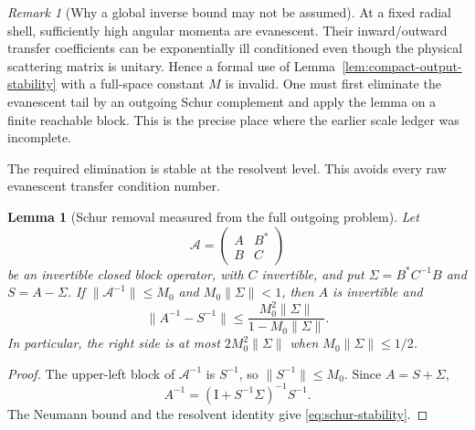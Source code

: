 \documentclass[11pt]{article}
\newtheorem{lemma}[theorem]{Lemma}
\theoremstyle{remark}
\newtheorem{remark}[theorem]{Remark}
\newcommand{\Id}{\mathrm I}
\begin{document}
\begin{remark}[Why a global inverse bound may not be assumed]
At a fixed radial shell, sufficiently high angular momenta are evanescent.
Their inward/outward transfer coefficients can be exponentially ill
conditioned even though the physical scattering matrix is unitary.  Hence a
formal use of Lemma~\ref{lem:compact-output-stability} with a full-space
constant $M$ is invalid.  One must first eliminate the evanescent tail by an
outgoing Schur complement and apply the lemma on a finite reachable block.
This is the precise place where the earlier scale ledger was incomplete.
\end{remark}

The required elimination is stable at the resolvent level.  This avoids every
raw evanescent transfer condition number.

\begin{lemma}[Schur removal measured from the full outgoing problem]
\label{lem:schur-stability}
Let
\[
 \mathcal A=
 \begin{pmatrix}A&B^*\\ B&C\end{pmatrix}
\]
be an invertible closed block operator, with $C$ invertible, and put
$\Sigma=B^*C^{-1}B$ and $S=A-\Sigma$.  If
$\|\mathcal A^{-1}\|\leq M_0$ and $M_0\|\Sigma\|<1$, then $A$ is invertible
and
\begin{equation}
 \|A^{-1}-S^{-1}\|
 \leq\frac{M_0^2\|\Sigma\|}{1-M_0\|\Sigma\|}.
 \label{eq:schur-stability}
\end{equation}
In particular, the right side is at most $2M_0^2\|\Sigma\|$ when
$M_0\|\Sigma\|\leq1/2$.
\end{lemma}

\begin{proof}
The upper-left block of $\mathcal A^{-1}$ is $S^{-1}$, so
$\|S^{-1}\|\leq M_0$.  Since $A=S+\Sigma$,
\[
 A^{-1}=(\Id+S^{-1}\Sigma)^{-1}S^{-1}.
\]
The Neumann bound and the resolvent identity give
\eqref{eq:schur-stability}.
\end{proof}
\end{document}
